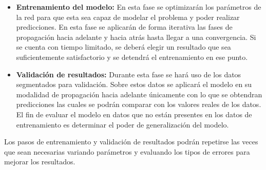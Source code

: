 \begin{itemize}
\item \textbf{Entrenamiento del modelo:} En esta fase se optimizarán los parámetros de la red para que esta sea capaz de modelar el problema y poder realizar predicciones. En esta fase se aplicarán de forma iterativa las fases de propagación hacia adelante y hacia atrás hasta llegar a una convergencia. Si se cuenta con tiempo limitado, se deberá elegir un resultado que sea suficientemente satisfactorio y se detendrá el entrenamiento en ese punto.

\item \textbf{Validación de resultados:} Durante esta fase se hará uso de los datos segmentados para validación. Sobre estos datos se aplicará el modelo en su modalidad de propagación hacia adelante únicamente con lo que se obtendran predicciones las cuales se podrán comparar con los valores reales de los datos. El fin de evaluar el modelo en datos que no están presentes en los datos de entrenamiento es determinar el poder de generalización del modelo.

\end{itemize}

Los pasos de entrenamiento y validación de resultados podrán repetirse las veces que sean necesarias variando parámetros y evaluando los tipos de errores para mejorar los resultados.
